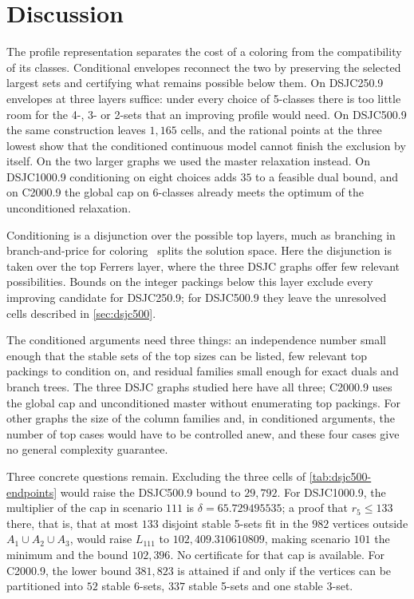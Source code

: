 \documentclass[11pt]{article}
\theoremstyle{definition}
\newcommand{\DSJCTwoFifty}{\textnormal{\textsc{DSJC250.9}}}
\newcommand{\DSJCFiveHundred}{\textnormal{\textsc{DSJC500.9}}}
\newcommand{\DSJCThousand}{\textnormal{\textsc{DSJC1000.9}}}
\newcommand{\CTwoThousand}{\textnormal{\textsc{C2000.9}}}
\begin{document}
\section{Discussion}
\label{sec:conclusion}

The profile representation separates the cost of a coloring from the
compatibility of its classes. Conditional envelopes reconnect the two by
preserving the selected largest sets and certifying what remains possible
below them. On \DSJCTwoFifty{} envelopes at three layers suffice: under every
choice of 5-classes there is too little room for the 4-, 3- or 2-sets that an
improving profile would need. On \DSJCFiveHundred{} the same construction
leaves $1{,}165$ cells, and the rational points at the three lowest show that
the conditioned continuous model cannot finish the exclusion by itself. On
the two larger graphs we used the master relaxation instead. On
\DSJCThousand{} conditioning on eight choices adds $35$ to a feasible dual
bound, and on \CTwoThousand{} the global cap on 6-classes already meets the
optimum of the unconditioned relaxation.

Conditioning is a disjunction over the possible top layers, much as branching
in branch-and-price for coloring~\cite{mehrotra1996,delledonne2021} splits
the solution space. Here the disjunction is taken over the top Ferrers layer,
where the three DSJC graphs offer few relevant possibilities. Bounds on the integer
packings below this layer exclude every improving candidate for
\DSJCTwoFifty{}; for \DSJCFiveHundred{} they leave the unresolved cells
described in \cref{sec:dsjc500}.

The conditioned arguments need three things: an independence number small
enough that the stable sets of the top sizes can be listed, few relevant top
packings to condition on, and residual families small enough for exact duals
and branch trees. The three DSJC graphs studied here have all three;
\CTwoThousand{} uses the global cap and unconditioned master without
enumerating top packings. For other graphs the size of the column families
and, in conditioned arguments, the number of top cases would have to be
controlled anew, and these four cases give no general complexity guarantee.

Three concrete questions remain. Excluding the three cells of
\cref{tab:dsjc500-endpoints} would raise the \DSJCFiveHundred{} bound to
$29{,}792$. For \DSJCThousand{}, the multiplier of the cap in scenario $111$
is $\delta=65.729495535$; a proof that $r_5\le133$ there, that is, that at
most $133$ disjoint stable 5-sets fit in the $982$ vertices outside
$A_1\cup A_2\cup A_3$, would raise $L_{111}$
to $102{,}409.310610809$, making scenario $101$ the minimum and the bound
$102{,}396$. No certificate for that cap is available. For \CTwoThousand{},
the lower bound $381{,}823$ is attained if and only if the vertices can be
partitioned into $52$ stable 6-sets, $337$ stable 5-sets and one stable
3-set.
\end{document}
